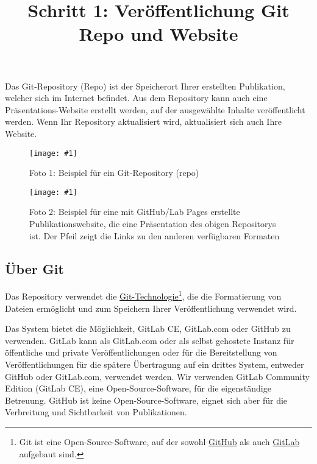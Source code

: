 \documentclass{article}
\newlength{\imgwidth}
\newcommand\scaledgraphics[2]{%
                
\settowidth{\imgwidth}{\texttt{[image: \#1]}}%
                
\setlength{\imgwidth}{\minof{\imgwidth}{#2\textwidth}}%
                
\texttt{[image: \#1]}%
                
}
\begin{document}
\title{Schritt 1: Veröffentlichung Git Repo und Website}

\maketitle


Das Git-Repository (Repo) ist der Speicherort Ihrer erstellten Publikation, welcher sich im Internet befindet. Aus dem Repository kann auch eine Präsentations-Website erstellt werden, auf der ausgewählte Inhalte veröffentlicht werden. Wenn Ihr Repository aktualisiert wird, aktualisiert sich auch Ihre Website.

\begin{figure}
\scaledgraphics{d80dc5a5-d385-4a3b-a03a-a752ff2686c9.png}{1}
\caption*{Foto 1: Beispiel für ein Git-Repository (repo)}\label{F86948651}
\end{figure}

\begin{figure}
\scaledgraphics{0aea86b5-871e-4b80-95ca-5b030854029d.png}{1}
\caption*{Foto 2: Beispiel für eine mit GitHub/Lab Pages erstellte Publikationswebsite, die eine Präsentation des obigen Repositorys ist. Der Pfeil zeigt die Links zu den anderen verfügbaren Formaten}\label{F80434841}
\end{figure}


\subsection{Über Git}\label{H9482233}



Das Repository verwendet die \href{https://git-scm.com/}{Git-Technologie}\footnote{Git ist eine Open-Source-Software, auf der sowohl \href{https://git-scm.com/}{GitHub} als auch \href{https://about.gitlab.com/}{GitLab} aufgebaut sind.}, die die Formatierung von Dateien ermöglicht und zum Speichern Ihrer Veröffentlichung verwendet wird.


Das System bietet die Möglichkeit, GitLab CE, GitLab.com oder GitHub zu verwenden. GitLab kann als GitLab.com oder als selbst gehostete Instanz für öffentliche und private Veröffentlichungen oder für die Bereitstellung von Veröffentlichungen für die spätere Übertragung auf ein drittes System, entweder GitHub oder GitLab.com, verwendet werden. Wir verwenden GitLab Community Edition (GitLab CE), eine Open-Source-Software, für die eigenständige Betreuung. GitHub ist keine Open-Source-Software, eignet sich aber für die Verbreitung und Sichtbarkeit von Publikationen.
\end{document}
